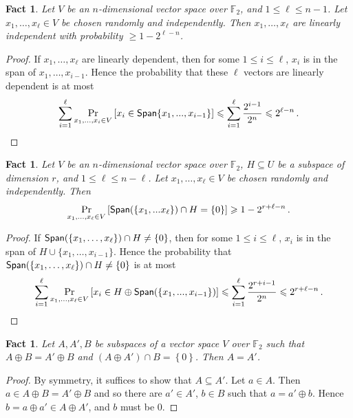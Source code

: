 \documentclass[11pt]{article}
\numberwithin{equation}{section}
\newtheorem{fact}[theorem]{Fact}
\theoremstyle{definition}
\theoremstyle{plain}
\newcommand\set[1]{{\left\{ #1 \right\}}}
\newcommand\Prob[2]{{\Pr_{#1}\left[ {#2} \right]}}
\newcommand\spnn[1]{{\sf Span}({#1})}
\newcommand*\xor{\mathbin{\oplus}}
\renewcommand\geq{\geqslant}
\renewcommand\leq{\leqslant}
\begin{document}
%
\begin{fact}\label{fact:aux_1}
Let $V$ be an $n$-dimensional vector space over $\mathbb{F}_2$,
and $1 \leq \ell \leq  n-1$. Let $x_1, \ldots, x_\ell \in V$ be chosen randomly and
independently. Then $x_1, \ldots, x_\ell$ are
linearly independent with probability $\geq 1-2^{\ell -n}$.
\end{fact}
\begin{proof} If $x_1, \ldots, x_\ell$ are linearly dependent, then for some
$1 \leq i \leq \ell$, $x_i$ is in the span of $x_1, \ldots, x_{i-1}$. Hence
the probability that these $\ell$ vectors are linearly dependent
%
is at most  %
%
\[   %
\sum\limits_{i=1}^{\ell}{\Prob{x_1,...,x_{i}\in V}
{x_i\in {\sf Span}{\set{x_1,...,x_{i-1}}}}} \leq
\sum\limits_{i=1}^{\ell}{\frac{2^{i-1}}{2^n}}\leq
2^{\ell-n}\,.     \qedhere
%
\]   %
\end{proof}

\begin{fact}\label{fact:aux_2}
Let $V$ be an $n$-dimensional vector space over $\mathbb{F}_2$,
$H\subseteq U$ be a subspace of dimension $r$, and $1 \leq \ell \leq  n-\ell$.
Let $x_1, \ldots, x_\ell \in V$ be chosen randomly and independently. Then
\[
\Prob{x_1,...,x_\ell \in V }{\spnn{\set{x_1,...x_\ell}}\cap H =\set{0}}\geq 1-2^{r+\ell-n}\,.%
\]
\end{fact}
\begin{proof} If ${\sf Span}(\{ x_1, \ldots, x_\ell\}) \cap H \neq  \{0\}$, then for some $1 \leq i \leq \ell$, $x_i$ is in the span of $H \cup \{x_1, \ldots, x_{i-1}\}$. Hence
the probability that ${\sf Span}(\{ x_1, \ldots, x_\ell\}) \cap H \neq  \{0\}$
%
is at most  %
%
\[     %
\sum\limits_{i=1}^{\ell}{\Prob{x_1,...,x_\ell \in V}
{{x_i\in H\xor\spnn{\set{x_1,...,x_{i-1}}}}}}
\leqslant\sum\limits_{i=1}^{\ell}{\frac{2^{r+i-1}}{2^{n}}}
\leqslant 2^{r+\ell-n}\,.   \qedhere
%
\]         %
\end{proof}

\begin{fact}\label{fact:aux_3}  %
%
Let  $A,A',B$ be subspaces of a vector space $V$ over ${\mathbb F}_2$ such that
$A\xor B = A'\xor B$ and $(A\xor A')\cap B = \set{0}$. Then $A=A'$.
\end{fact}
\begin{proof}
By symmetry, it suffices to show that $A\subseteq A'$. Let $a\in A$. Then
$a\in A\xor B = A'\xor B$ and so there are $a'\in A'$, $b\in B$ such
that $a = a' \xor b$. Hence $b=a\xor a'\in A\xor A'$, and $b$ must be $0$.
\end{proof}
\end{document}
